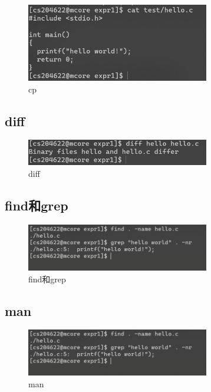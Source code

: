 \documentclass[a4paper,twoside]{article}
\begin{document}
\begin{spacing}{1.2}
\begin{figure}[H]
	\centering
	\includegraphics[width=8.0cm]{cp.png}
	\caption{cp}
\end{figure}

\subsection{diff}

\begin{figure}[H]
	\centering
	\includegraphics[width=8.0cm]{diff.png}
	\caption{diff}
\end{figure}

\subsection{find和grep}

\begin{figure}[H]
	\centering
	\includegraphics[width=8.0cm]{findgrep.png}
	\caption{find和grep}
\end{figure}

\subsection{man}

\begin{figure}[H]
	\centering
	\includegraphics[width=8.0cm]{findgrep.png}
	\caption{man}
\end{figure}


\end{spacing}
\end{document}
